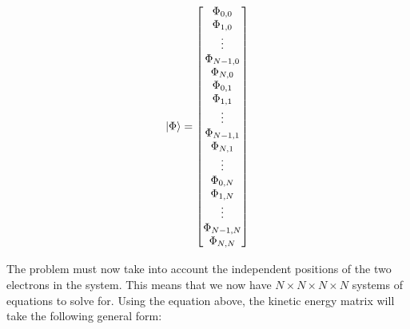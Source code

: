 \documentclass[10pt, oneside, letterpaper]{article}
\begin{document}
\begin{align*}
\ket{\Phi} =
\begin{bmatrix}
\Phi_{0,0}    \\
\Phi_{1,0}    \\
\vdots        \\
\Phi_{N-1,0}  \\ 
\Phi_{N,0}    \\
\Phi_{0,1}    \\
\Phi_{1,1}    \\
\vdots        \\
\Phi_{N-1,1}  \\ 
\Phi_{N,1}    \\
\vdots        \\
\Phi_{0,N}    \\
\Phi_{1,N}    \\
\vdots        \\
\Phi_{N-1,N}  \\
\Phi_{N,N}    \\ 
\end{bmatrix}
\end{align*}

The problem must now take into account the independent positions of the two electrons in the system. This means that we now have $N \times N \times N \times N$ systems of equations to solve for. Using the equation above, the kinetic energy matrix will take the following general form:
\end{document}
